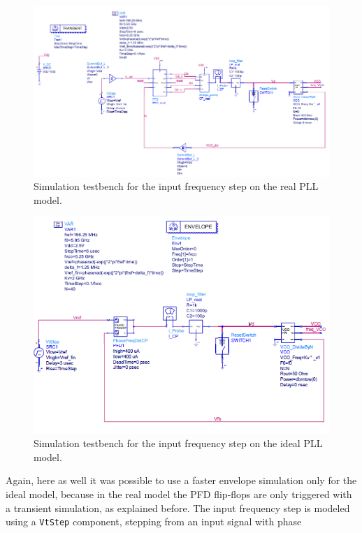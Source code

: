 \documentclass[lettersize,journal]{IEEEtran}
\begin{document}
\begin{figure}[!h]
    \centering
    \includegraphics[width=\linewidth]{images/ads_results/freq_step/schematic_real.png}
    \caption{Simulation testbench for the input frequency step on the real PLL model.}
    \label{fig:freq_step_schem_real}
\end{figure}

\begin{figure}[!h]
    \centering
    \includegraphics[width=\linewidth]{images/ads_results/freq_step/schematic_ideal.png}
    \caption{Simulation testbench for the input frequency step on the ideal PLL model.}
    \label{fig:freq_step_schem_ideal}
\end{figure}

Again, here as well it was possible to use a faster envelope simulation only for the ideal model, because in the real model the PFD flip-flops are only triggered with a transient simulation, as explained before. The input frequency step is modeled using a \texttt{VtStep} component, stepping from an input signal with phase
\end{document}
